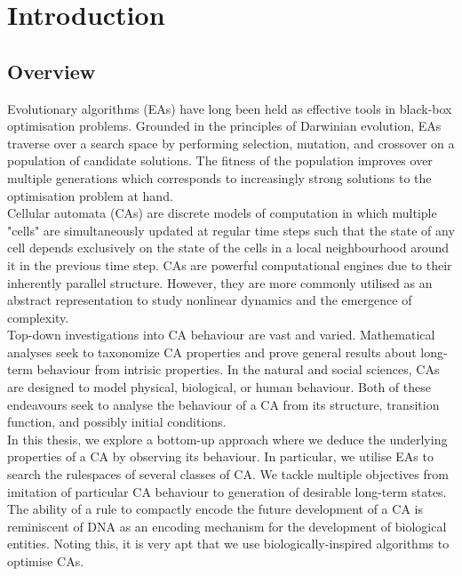 \chapter{Introduction}

\section{Overview}

Evolutionary algorithms (EAs) have long been held as effective tools in black-box optimisation problems. Grounded in the principles of Darwinian evolution, EAs traverse over a search space by performing selection, mutation, and crossover on a population of candidate solutions. The fitness of the population improves over multiple generations which corresponds to increasingly strong solutions to the optimisation problem at hand.\\

Cellular automata (CAs) are discrete models of computation in which multiple "cells" are simultaneously updated at regular time steps such that the state of any cell depends exclusively on the state of the cells in a local neighbourhood around it in the previous time step. CAs are powerful computational engines due to their inherently parallel structure. However, they are more commonly utilised as an abstract representation to study nonlinear dynamics and the emergence of complexity.\\

Top-down investigations into CA behaviour are vast and varied. Mathematical analyses seek to taxonomize CA properties and prove general results about long-term behaviour from intrisic properties. In the natural and social sciences, CAs are designed to model physical, biological, or human behaviour. Both of these endeavours seek to analyse the behaviour of a CA from its structure, transition function, and possibly initial conditions.\\

In this thesis, we explore a bottom-up approach where we deduce the underlying properties of a CA by observing its behaviour. In particular, we utilise EAs to search the rulespaces of several classes of CA. We tackle multiple objectives from imitation of particular CA behaviour to generation of desirable long-term states. The ability of a rule to compactly encode the future development of a CA is reminiscent of DNA as an encoding mechanism for the development of biological entities. Noting this, it is very apt that we use biologically-inspired algorithms to optimise CAs.\\


